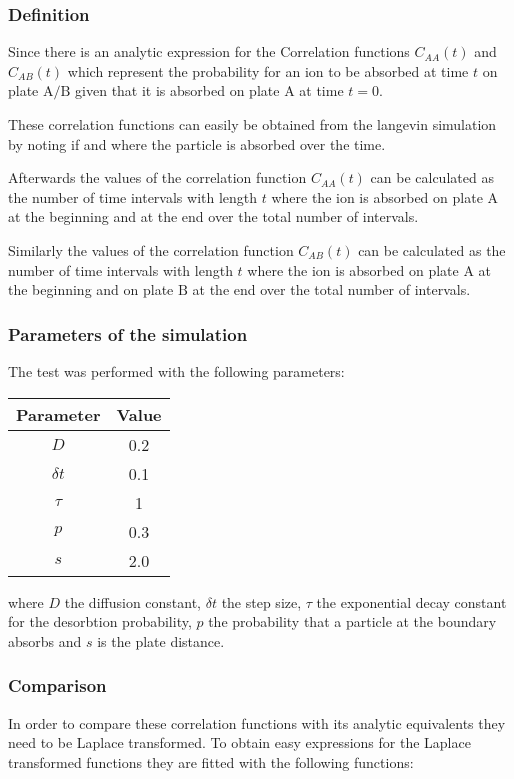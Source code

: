 \documentclass[a4paper, parskip=half]{scrartcl}
\begin{document}
\subsubsection{Definition}
Since there is an analytic expression for the Correlation functions $C_{AA}(t)$ and $C_{AB}(t)$ which represent the probability for an ion to be absorbed at time $t$ on plate $\mathrm{A}/\mathrm{B}$ given that it is absorbed on plate $\mathrm{A}$ at time $t=0$.

These correlation functions can easily be obtained from the langevin simulation by noting if and where the particle is absorbed over the time. 

Afterwards the values of the correlation function $C_{AA}(t)$ can be calculated as the number of time intervals with length $t$ where the ion is absorbed on plate $\mathrm{A}$ at the beginning and at the end over the total number of intervals.

Similarly the values of the correlation function $C_{AB}(t)$ can be calculated as the number of time intervals with length $t$ where the ion is absorbed on plate $\mathrm{A}$ at the beginning and on plate $\mathrm{B}$ at the end over the total number of intervals.

\subsubsection{Parameters of the simulation}
The test was performed with the following parameters:
\begin{center}
\begin{tabular}{c|c}
Parameter & Value \\\hline
$D$ & 0.2 \\
$\delta t$ & 0.1 \\
$\tau$ & 1 \\
$p$ & 0.3 \\
$s$ & 2.0
\end{tabular}
\end{center}

where $D$ the diffusion constant, $\delta t$ the step size, $\tau$ the exponential decay constant for the desorbtion probability, $p$ the probability that a particle at the boundary absorbs and $s$ is the plate distance.
\subsubsection{Comparison}
In order to compare these correlation functions with its analytic equivalents they need to be Laplace transformed. To obtain easy expressions for the Laplace transformed functions they are fitted with the following functions:
\end{document}
